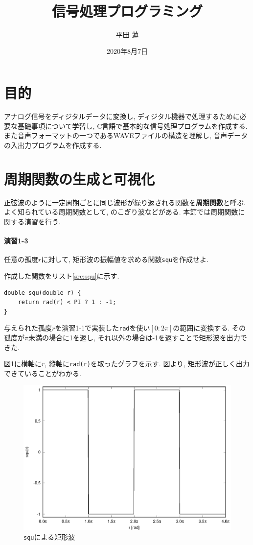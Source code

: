 \documentclass[titlepage]{jsarticle}
\title{信号処理プログラミング}
\author{平田 蓮}
\date{2020年8月7日}
\begin{document}
\maketitle
\section{目的}
    アナログ信号をディジタルデータに変換し, ディジタル機器で処理するために必要な基礎事項について学習し,
    C言語で基本的な信号処理プログラムを作成する.
    また音声フォーマットの一つであるWAVEファイルの構造を理解し, 音声データの入出力プログラムを作成する.

\section{周期関数の生成と可視化}
    正弦波のように一定周期ごとに同じ波形が繰り返される関数を\textbf{周期関数}と呼ぶ.
    よく知られている周期関数として, のこぎり波などがある.
    本節では周期関数に関する演習を行う.

    \paragraph{演習1-3} 任意の孤度$r$に対して, 矩形波の振幅値を求める関数\verb|squ|を作成せよ.

        作成した関数をリスト\ref{src:squ}に示す.

        \begin{lstlisting}[caption=squ.c, label=src:squ]
double squ(double r) {
    return rad(r) < PI ? 1 : -1;
}\end{lstlisting}

        与えられた孤度$r$を演習1-1で実装した\verb|rad|を使い$[0:2\pi]$の範囲に変換する.
        その孤度が$\pi$未満の場合に1を返し, それ以外の場合は-1を返すことで矩形波を出力できた.

        図\ref{fig:squ}に横軸に$r$, 縦軸に\verb|rad(r)|を取ったグラフを示す.
        図より, 矩形波が正しく出力できていることがわかる.

        \begin{figure}[h]
            \centering
            \includegraphics[width=0.8\hsize]{images/squ.eps}
            \cprotect\caption{\verb|squ|による矩形波}
            \label{fig:squ}
        \end{figure}
\end{document}
